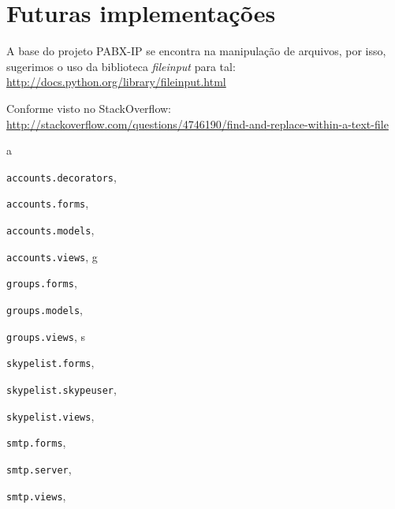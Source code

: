 \documentclass[letterpaper,10pt,brazil]{sphinxmanual}
\begin{document}
\section{Futuras implementações}
\label{futuro::doc}\label{futuro:futuras-implementacoes}
A base do projeto PABX-IP se encontra na manipulação de arquivos, por isso, sugerimos o uso da biblioteca \emph{fileinput} para tal:  \href{http://docs.python.org/library/fileinput.html}{http://docs.python.org/library/fileinput.html}

Conforme visto no StackOverflow:
\href{http://stackoverflow.com/questions/4746190/find-and-replace-within-a-text-file}{http://stackoverflow.com/questions/4746190/find-and-replace-within-a-text-file}


\renewcommand{\indexname}{Índice de Módulos do Python}
\begin{theindex}
\def\bigletter#1{{\Large\sffamily#1}\nopagebreak\vspace{1mm}}
\bigletter{a}
\item {\texttt{accounts.decorators}}, \pageref{apps/accounts:module-accounts.decorators}
\item {\texttt{accounts.forms}}, \pageref{apps/accounts:module-accounts.forms}
\item {\texttt{accounts.models}}, \pageref{apps/accounts:module-accounts.models}
\item {\texttt{accounts.views}}, \pageref{apps/accounts:module-accounts.views}
\indexspace
\bigletter{g}
\item {\texttt{groups.forms}}, \pageref{apps/groups:module-groups.forms}
\item {\texttt{groups.models}}, \pageref{apps/groups:module-groups.models}
\item {\texttt{groups.views}}, \pageref{apps/groups:module-groups.views}
\indexspace
\bigletter{s}
\item {\texttt{skypelist.forms}}, \pageref{apps/skypelist:module-skypelist.forms}
\item {\texttt{skypelist.skypeuser}}, \pageref{apps/skypelist:module-skypelist.skypeuser}
\item {\texttt{skypelist.views}}, \pageref{apps/skypelist:module-skypelist.views}
\item {\texttt{smtp.forms}}, \pageref{apps/smtp:module-smtp.forms}
\item {\texttt{smtp.server}}, \pageref{apps/smtp:module-smtp.server}
\item {\texttt{smtp.views}}, \pageref{apps/smtp:module-smtp.views}
\end{theindex}

\renewcommand{\indexname}{Índice}
\printindex
\end{document}
